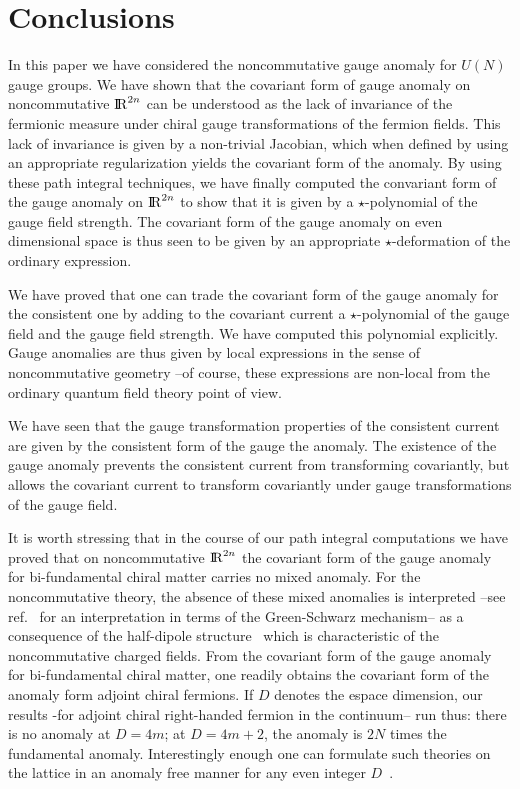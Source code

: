 \documentclass[a4paper,12pt]{article}
\def\RR{{\rm I\!\!\, R}}
\begin{document}
\section{Conclusions}

In this paper we have considered the noncommutative gauge anomaly for $U(N)$ 
gauge groups.
We have shown that the covariant form of gauge anomaly on noncommutative
$\RR^{2n}$ can be understood as the lack of invariance of the 
fermionic measure under chiral gauge transformations of the fermion fields. 
This lack of invariance is given by a non-trivial Jacobian, which when
defined by using an appropriate regularization  yields the covariant form 
of the anomaly. By using these path integral techniques, we have finally 
computed the convariant form of the gauge anomaly on $\RR^{2n}$ to show 
that it is given by a $\star$-polynomial of the gauge field strength.
The covariant form of the gauge anomaly on even dimensional space is thus 
seen to be given by an appropriate $\star$-deformation of the ordinary 
expression.   

We have  proved that one can trade the covariant form of the gauge
anomaly for the consistent one by adding to the covariant current a
$\star$-polynomial of the gauge field and the gauge field strength.
We have computed this polynomial explicitly.
Gauge anomalies are thus given by local expressions in the sense of 
noncommutative geometry --of course, these expressions are non-local from 
the ordinary quantum field theory point of view. 

We have seen that the gauge transformation properties of the consistent 
current are given by the consistent form of the gauge the anomaly. The 
existence of the gauge anomaly  prevents 
the consistent current from transforming covariantly, but allows  
the covariant current to  transform covariantly under 
gauge transformations of the gauge field.      


It is worth stressing that in the course of our path integral computations 
 we have proved that on noncommutative $\RR^{2n}$ the covariant form 
of the gauge anomaly for bi-fundamental  
chiral matter  carries no mixed anomaly. For the noncommutative 
theory, the absence of these mixed anomalies is interpreted 
--see ref.~\cite{Intriligator:2001yu}  for an 
interpretation in terms of the Green-Schwarz mechanism-- as a consequence 
of the half-dipole structure~\cite{Alvarez-Gaume:2001bv} which is 
characteristic of the noncommutative charged fields. 
From the covariant form of the gauge anomaly for bi-fundamental chiral matter,
one readily obtains the covariant form of the anomaly form adjoint chiral 
fermions. If $D$ denotes the espace dimension, our results -for adjoint chiral right-handed fermion in the continuum-- run thus: there is no anomaly at $D=4m$; at $D=4m+2$, the anomaly is $2N$ times the fundamental anomaly. Interestingly enough one can formulate such theories on the lattice in an anomaly 
free manner for any even integer $D$~\cite{Nishimura:2001dq}. 
\end{document}

